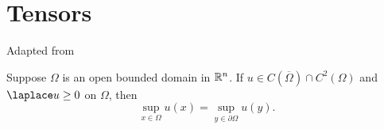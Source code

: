 
\section{Tensors}%
\label{sec:tensors_appendix}



Adapted from \cite[Thm. 2.1]{Taylor}
\begin{theorem}%
  \label{thm:ana.max_principle}
  Suppose $\Omega$ is an open bounded domain in ${\mathbb{R}}^n$.
  If $u \in C(\overline{\Omega}) \cap C^2(\Omega)$ and $\laplace u \ge 0$ on $\Omega$, then
  \[
    \sup_{x \in \Omega} u(x) = \sup_{y \in \partial\Omega} u(y).
  \]
\end{theorem}

